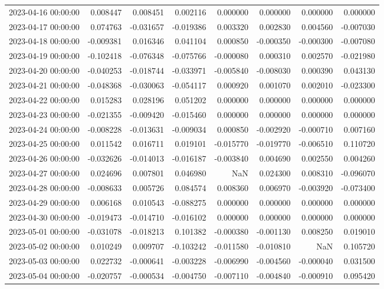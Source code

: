 \begin{tabular}{lrrrrrrr}
2023-04-16 00:00:00 & 0.008447 & 0.008451 & 0.002116 & 0.000000 & 0.000000 & 0.000000 & 0.000000 \\
2023-04-17 00:00:00 & 0.074763 & -0.031657 & -0.019386 & 0.003320 & 0.002830 & 0.004560 & -0.007030 \\
2023-04-18 00:00:00 & -0.009381 & 0.016346 & 0.041104 & 0.000850 & -0.000350 & -0.000300 & -0.007080 \\
2023-04-19 00:00:00 & -0.102418 & -0.076348 & -0.075766 & -0.000080 & 0.000310 & 0.002570 & -0.021980 \\
2023-04-20 00:00:00 & -0.040253 & -0.018744 & -0.033971 & -0.005840 & -0.008030 & 0.000390 & 0.043130 \\
2023-04-21 00:00:00 & -0.048368 & -0.030063 & -0.054117 & 0.000920 & 0.001070 & 0.002010 & -0.023300 \\
2023-04-22 00:00:00 & 0.015283 & 0.028196 & 0.051202 & 0.000000 & 0.000000 & 0.000000 & 0.000000 \\
2023-04-23 00:00:00 & -0.021355 & -0.009420 & -0.015460 & 0.000000 & 0.000000 & 0.000000 & 0.000000 \\
2023-04-24 00:00:00 & -0.008228 & -0.013631 & -0.009034 & 0.000850 & -0.002920 & -0.000710 & 0.007160 \\
2023-04-25 00:00:00 & 0.011542 & 0.016711 & 0.019101 & -0.015770 & -0.019770 & -0.006510 & 0.110720 \\
2023-04-26 00:00:00 & -0.032626 & -0.014013 & -0.016187 & -0.003840 & 0.004690 & 0.002550 & 0.004260 \\
2023-04-27 00:00:00 & 0.024696 & 0.007801 & 0.046980 & NaN & 0.024300 & 0.008310 & -0.096070 \\
2023-04-28 00:00:00 & -0.008633 & 0.005726 & 0.084574 & 0.008360 & 0.006970 & -0.003920 & -0.073400 \\
2023-04-29 00:00:00 & 0.006168 & 0.010543 & -0.088275 & 0.000000 & 0.000000 & 0.000000 & 0.000000 \\
2023-04-30 00:00:00 & -0.019473 & -0.014710 & -0.016102 & 0.000000 & 0.000000 & 0.000000 & 0.000000 \\
2023-05-01 00:00:00 & -0.031078 & -0.018213 & 0.101382 & -0.000380 & -0.001130 & 0.008250 & 0.019010 \\
2023-05-02 00:00:00 & 0.010249 & 0.009707 & -0.103242 & -0.011580 & -0.010810 & NaN & 0.105720 \\
2023-05-03 00:00:00 & 0.022732 & -0.000641 & -0.003228 & -0.006990 & -0.004560 & -0.000040 & 0.031500 \\
2023-05-04 00:00:00 & -0.020757 & -0.000534 & -0.004750 & -0.007110 & -0.004840 & -0.000910 & 0.095420 \\

\end{tabular}

